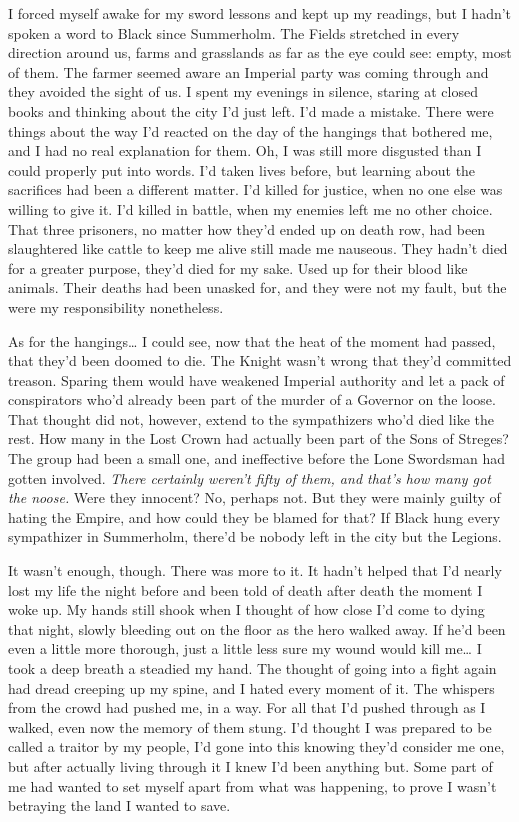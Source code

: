 \documentclass[12pt, openany]{book}
\begin{document}
I forced myself awake for my sword lessons and kept up my readings, but I hadn’t spoken a word to Black since Summerholm. The Fields stretched in every direction around us, farms and grasslands as far as the eye could see: empty, most of them. The farmer seemed aware an Imperial party was coming through and they avoided the sight of us. I spent my evenings in silence, staring at closed books and thinking about the city I’d just left. I’d made a mistake. There were things about the way I’d reacted on the day of the hangings that bothered me, and I had no real explanation for them. Oh, I was still more disgusted than I could properly put into words. I’d taken lives before, but learning about the sacrifices had been a different matter. I’d killed for justice, when no one else was willing to give it. I’d killed in battle, when my enemies left me no other choice. That three prisoners, no matter how they’d ended up on death row, had been slaughtered like cattle to keep me alive still made me nauseous. They hadn’t died for a greater purpose, they’d died for my sake. Used up for their blood like animals. Their deaths had been unasked for, and they were not my fault, but the were my responsibility nonetheless.

As for the hangings… I could see, now that the heat of the moment had passed, that they’d been doomed to die. The Knight wasn’t wrong that they’d committed treason. Sparing them would have weakened Imperial authority and let a pack of conspirators who’d already been part of the murder of a Governor on the loose. That thought did not, however, extend to the sympathizers who’d died like the rest. How many in the Lost Crown had actually been part of the Sons of Streges? The group had been a small one, and ineffective before the Lone Swordsman had gotten involved. \textit{There certainly weren’t fifty of them, and that’s how many got the noose.} Were they innocent? No, perhaps not. But they were mainly guilty of hating the Empire, and how could they be blamed for that? If Black hung every sympathizer in Summerholm, there’d be nobody left in the city but the Legions. 

It wasn’t enough, though. There was more to it. It hadn’t helped that I’d nearly lost my life the night before and been told of death after death the moment I woke up. My hands still shook when I thought of how close I’d come to dying that night, slowly bleeding out on the floor as the hero walked away. If he’d been even a little more thorough, just a little less sure my wound would kill me… I took a deep breath a steadied my hand. The thought of going into a fight again had dread creeping up my spine, and I hated every moment of it. The whispers from the crowd had pushed me, in a way. For all that I’d pushed through as I walked, even now the memory of them stung. I’d thought I was prepared to be called a traitor by my people, I’d gone into this knowing they’d consider me one, but after actually living through it I knew I’d been anything but. Some part of me had wanted to set myself apart from what was happening, to prove I wasn’t betraying the land I wanted to save. 
\end{document}
